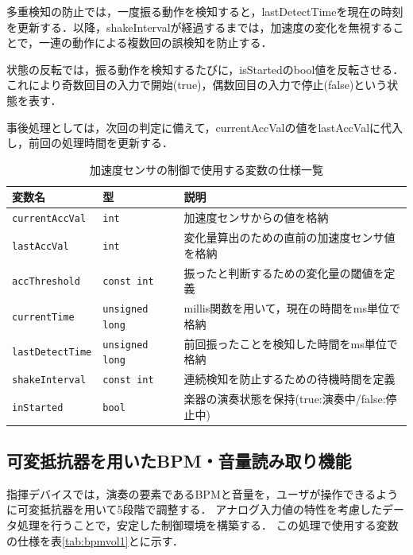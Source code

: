 \documentclass[lualatex,book,paper=a4paper,jafontsize=11.5pt,jafontscale=1.05]{jlreq}
\begin{document}
多重検知の防止では，一度振る動作を検知すると，lastDetectTimeを現在の時刻を更新する．以降，shakeIntervalが経過するまでは，加速度の変化を無視することで，一連の動作による複数回の誤検知を防止する．

状態の反転では，振る動作を検知するたびに，isStartedのbool値を反転させる．これにより奇数回目の入力で開始(true)，偶数回目の入力で停止(false)という状態を表す．

事後処理としては，次回の判定に備えて，currentAccValの値をlastAccValに代入し，前回の処理時間を更新する．


\begin{table}[H]
  \centering
  \caption{加速度センサの制御で使用する変数の仕様一覧}
  \label{tab:acc}
  \begin{tabular}{llp{6cm}} \hline
    変数名 & 型 & 説明 \\ \hline
	  \texttt{currentAccVal} & \texttt{int} & 加速度センサからの値を格納 \\ \hline
    \texttt{lastAccVal} & \texttt{int}  & 変化量算出のための直前の加速度センサ値を格納 \\\hline
    \texttt{accThreshold} & \texttt{const int}  & 振ったと判断するための変化量の閾値を定義 \\\hline
    \texttt{currentTime} & \texttt{unsigned long}  & millis関数を用いて，現在の時間をms単位で格納 \\ \hline
    \texttt{lastDetectTime} & \texttt{unsigned long}  & 前回振ったことを検知した時間をms単位で格納 \\ \hline
    \texttt{shakeInterval} & \texttt{const int}  & 連続検知を防止するための待機時間を定義 \\ \hline
	  \texttt{inStarted} & \texttt{bool}  & 楽器の演奏状態を保持(true:演奏中/false:停止中)\\ \hline
  \end{tabular}
\end{table}

\subsection{可変抵抗器を用いたBPM・音量読み取り機能}
指揮デバイスでは，演奏の要素であるBPMと音量を，ユーザが操作できるように可変抵抗器を用いて5段階で調整する．
アナログ入力値の特性を考慮したデータ処理を行うことで，安定した制御環境を構築する．
この処理で使用する変数の仕様を表\ref{tab:bpmvol1}とに示す．
\end{document}
